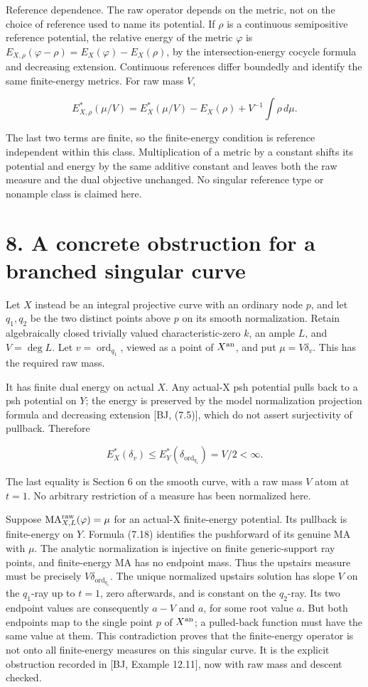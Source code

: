 \documentclass[11pt]{article}
\begin{document}
Reference dependence. The raw operator depends on the metric, not on the choice of reference used to name its potential. If $\rho$ is a continuous semipositive reference potential, the relative energy of the metric $\varphi$ is $E_{X,\rho}(\varphi-\rho)=E_X(\varphi)-E_X(\rho)$, by the intersection-energy cocycle formula and decreasing extension. Continuous references differ boundedly and identify the same finite-energy metrics. For raw mass $V$,

\[
 E_{X,\rho}^*(\mu/V)=E_X^*(\mu/V)-E_X(\rho)+V^{-1}\int\rho\,d\mu.
\]

The last two terms are finite, so the finite-energy condition is reference independent within this class. Multiplication of a metric by a constant shifts its potential and energy by the same additive constant and leaves both the raw measure and the dual objective unchanged. No singular reference type or nonample class is claimed here.

\section*{8. A concrete obstruction for a branched singular curve}
Let $X$ instead be an integral projective curve with an ordinary node $p$, and let $q_1,q_2$ be the two distinct points above $p$ on its smooth normalization. Retain algebraically closed trivially valued characteristic-zero $k$, an ample $L$, and $V=\deg L$. Let $v=\operatorname{ord}_{q_1}$, viewed as a point of $X^{\rm an}$, and put $\mu=V\delta_v$. This has the required raw mass.

It has finite dual energy on actual $X$. Any actual-X psh potential pulls back to a psh potential on $Y$; the energy is preserved by the model normalization projection formula and decreasing extension [BJ, (7.5)], which do not assert surjectivity of pullback. Therefore

\[
 E_X^*(\delta_v)\leq E_Y^*(\delta_{\operatorname{ord}_{q_1}})=V/2<\infty.
\]

The last equality is Section 6 on the smooth curve, with a raw mass $V$ atom at $t=1$. No arbitrary restriction of a measure has been normalized here.

Suppose $\mathrm{MA}^{\rm raw}_{X,L}(\varphi)=\mu$ for an actual-X finite-energy potential. Its pullback is finite-energy on $Y$. Formula (7.18) identifies the pushforward of its genuine MA with $\mu$. The analytic normalization is injective on finite generic-support ray points, and finite-energy MA has no endpoint mass. Thus the upstairs measure must be precisely $V\delta_{\operatorname{ord}_{q_1}}$. The unique normalized upstairs solution has slope $V$ on the $q_1$-ray up to $t=1$, zero afterwards, and is constant on the $q_2$-ray. Its two endpoint values are consequently $a-V$ and $a$, for some root value $a$. But both endpoints map to the single point $p$ of $X^{\rm an}$; a pulled-back function must have the same value at them. This contradiction proves that the finite-energy operator is not onto all finite-energy measures on this singular curve. It is the explicit obstruction recorded in [BJ, Example 12.11], now with raw mass and descent checked.
\end{document}
